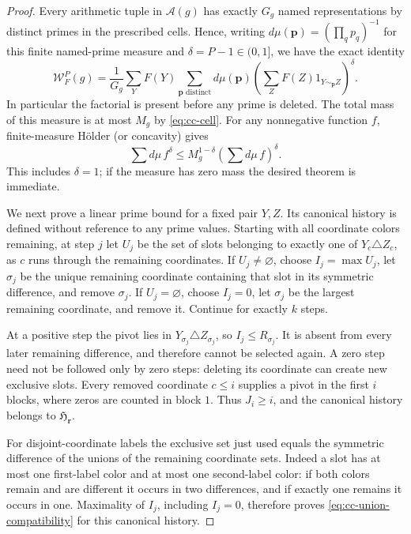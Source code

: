 \begin{proof}
Every arithmetic tuple in $\mathcal A(g)$ has exactly $G_g$ named
representations by distinct primes in the prescribed cells. Hence,
writing $d\mu(\mathbf p)=(\prod_qp_q)^{-1}$ for this finite
named-prime measure and $\delta=P-1\in(0,1]$, we have the exact
identity
\begin{equation}\label{eq:cc-factorial-identity}
 \mathcal W_F^P(g)=\frac1{G_g}
   \sum_Y F(Y)\sum_{\mathbf p\text{ distinct}}d\mu(\mathbf p)
       \left(\sum_ZF(Z)1_{Y\sim_{\mathbf p}Z}\right)^\delta.
\end{equation}
In particular the factorial is present before any prime is deleted.
The total mass of this measure is at most $M_g$ by
\eqref{eq:cc-cell}. For any nonnegative function $f$, finite-measure
H\"older (or concavity) gives
\begin{equation}\label{eq:cc-prime-interpolation}
        \sum d\mu\,f^\delta
        \le M_g^{1-\delta}\left(\sum d\mu\,f\right)^\delta.
\end{equation}
This includes $\delta=1$; if the measure has zero mass the desired
theorem is immediate.

We next prove a linear prime bound for a fixed pair $Y,Z$. Its
canonical history is defined without reference to any prime values.
Starting with all coordinate colors remaining, at step $j$ let
$U_j$ be the set of slots belonging to exactly one of
$Y_c\triangle Z_c$, as $c$ runs through the remaining coordinates.
If $U_j\ne\varnothing$, choose $I_j=\max U_j$, let $\sigma_j$
be the unique remaining coordinate containing that slot in its
symmetric difference, and remove $\sigma_j$. If
$U_j=\varnothing$, choose $I_j=0$, let $\sigma_j$ be the largest
remaining coordinate, and remove it. Continue for exactly $k$ steps.

At a positive step the pivot lies in
$Y_{\sigma_j}\triangle Z_{\sigma_j}$, so $I_j\le R_{\sigma_j}$.
It is absent from every later remaining difference, and therefore
cannot be selected again. A zero step need not be followed only by
zero steps: deleting its coordinate can create new exclusive slots.
Every removed coordinate $c\le i$ supplies a pivot in the first
$i$ blocks, where zeros are counted in block $1$. Thus $J_i\ge i$,
and the canonical history belongs to $\mathfrak H_{\mathbf r}$.

For disjoint-coordinate labels the exclusive set just used equals
the symmetric difference of the unions of the remaining coordinate
sets. Indeed a slot has at most one first-label color and at most
one second-label color: if both colors remain and are different it
occurs in two differences, and if exactly one remains it occurs in
one. Maximality of $I_j$, including $I_j=0$, therefore proves
\eqref{eq:cc-union-compatibility} for this canonical history.


\end{proof}
